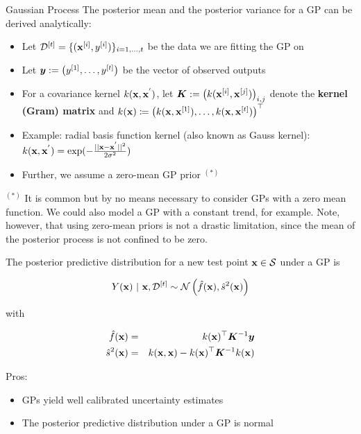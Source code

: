 \documentclass[11pt,compress,t,notes=noshow, xcolor=table]{beamer}
\begin{document}
\begin{vbframe}{Gaussian Process}
The posterior mean and the posterior variance for a GP can be derived analytically: 

\begin{itemize}
  \item Let $\mathcal{D}^{[t]} = \{(\mathbf{x}^{[i]}, y^{[i]})\}_{i = 1, \ldots, t}$ be the data we are fitting the GP on
  \item Let $\bm{y}:= \left(y^{[1]}, \ldots, y^{[t]}\right)$ be the vector of observed outputs
  \item For a covariance kernel $k(\mathbf{x}, \mathbf{x}^{'})$, let $\bm{K} := \left(k(\mathbf{x}^{[i]}, \mathbf{x}^{[j]})\right)_{i,j}$ denote the \textbf{kernel (Gram) matrix} and $k(\mathbf{x}) \coloneqq \left(k(\mathbf{x}, \mathbf{x}^{[1]}), \ldots, k(\mathbf{x}, \mathbf{x}^{[t]})\right)^\top$
  \item Example: radial basis function kernel (also known as Gauss kernel): $k(\mathbf{x}, \mathbf{x}^{'})=\exp (-\frac{||\mathbf{x} - \mathbf{x}^{'}||^2}{2 \sigma^2})$
  \item Further, we assume a zero-mean GP prior $^{(*)}$  
\end{itemize}

\vfill

\begin{footnotesize}
 $^{(*)}$ It is common but by no means necessary to consider GPs with a zero mean function. We could also model a GP with a constant trend, for example. Note, however, that using zero-mean priors is not a drastic limitation, since the mean of the posterior process is not confined to be zero. 
\end{footnotesize}

\framebreak 

The posterior predictive distribution for a new test point $\mathbf{x} \in \mathcal{S}$ under a GP is

\begin{eqnarray*}
  Y(\mathbf{x}) ~|~ \mathbf{x}, \mathcal{D}^{[t]} \sim \mathcal{N}\left(\hat{f}(\mathbf{x}), \hat{s}^2(\mathbf{x})\right)
\end{eqnarray*}

with 

\begin{eqnarray*}
  \hat{f}(\mathbf{x}) &=& k(\mathbf{x})^\top \bm{K}^{-1} \bm{y} \\
  \hat{s}^2(\mathbf{x}) &=& k(\mathbf{x}, \mathbf{x}) - k(\mathbf{x})^\top \bm{K}^{-1} k(\mathbf{x})
\end{eqnarray*}

\vfill

\framebreak

Pros:
\begin{itemize}
  \item GPs yield well calibrated uncertainty estimates
  \item The posterior predictive distribution under a GP is normal
\end{itemize}


\end{vbframe}
\end{document}

